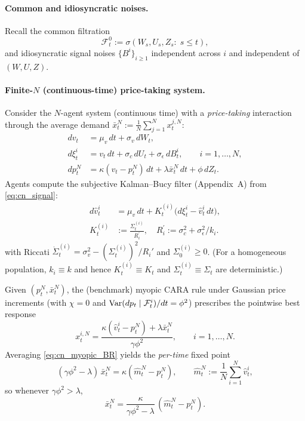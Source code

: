 \paragraph{Common and idiosyncratic noises.}
Recall the common filtration
\[
\mathcal F^0_t := \sigma(W_s,U_s,Z_s:\; s\le t),
\]
and idiosyncratic signal noises $\{B^i\}_{i\ge 1}$ independent across $i$ and independent of $(W,U,Z)$.

\paragraph{Finite-$N$ (continuous-time) price-taking system.}
Consider the $N$-agent system (continuous time) with a \emph{price-taking} interaction through the
average demand $\bar x^N_t := \frac1N\sum_{j=1}^N x^{j,N}_t$:
\begin{align}
dv_t &= \mu_v\,dt + \sigma_v\,dW_t, \label{eq:cn_v}\\
d\xi^i_t &= v_t\,dt + \sigma_c\,dU_t + \sigma_\epsilon\,dB^i_t,\qquad i=1,\dots,N, \label{eq:cn_signal}\\
dp^N_t &= \kappa(v_t-p^N_t)\,dt + \lambda \bar x^N_t\,dt + \phi\,dZ_t. \label{eq:cn_priceN}
\end{align}
Agents compute the subjective Kalman--Bucy filter (Appendix~A) from \eqref{eq:cn_signal}:
\begin{equation}\label{eq:cn_filter}
\begin{split}
d\hat v^{i}_t &= \mu_v\,dt + K_t^{(i)}\bigl(d\xi^i_t - \hat v^{i}_t\,dt\bigr),\\
K_t^{(i)} &:= \frac{\Sigma_t^{(i)}}{R^{\prime}_i},\quad R^{\prime}_i:=\sigma_c^2+\sigma_\epsilon^2/k_i.
\end{split}
\end{equation}
with Riccati $\dot\Sigma_t^{(i)}=\sigma_v^2-(\Sigma_t^{(i)})^2/R_i'$ and $\Sigma_0^{(i)}\ge 0$.
(For a homogeneous population, $k_i\equiv k$ and hence $K_t^{(i)}\equiv K_t$ and $\Sigma_t^{(i)}\equiv \Sigma_t$
are deterministic.)

Given $(p^N_t,\bar x^N_t)$, the (benchmark) myopic CARA rule under Gaussian price increments (with $\chi=0$ and $\text{Var}(dp_t\mid\mathcal F_t^i)/dt=\phi^2$) prescribes the pointwise best response
\begin{equation}\label{eq:cn_myopic_BR}
x^{i,N}_t
= \frac{\kappa(\hat v^i_t-p^N_t)+\lambda \bar x^N_t}{\gamma\phi^2},
\qquad i=1,\dots,N.
\end{equation}
Averaging \eqref{eq:cn_myopic_BR} yields the \emph{per-time} fixed point
\begin{equation}\label{eq:cn_fpN}
(\gamma\phi^2-\lambda)\,\bar x^N_t = \kappa(\hat m^N_t-p^N_t),
\qquad
\hat m^N_t:=\frac1N\sum_{i=1}^N \hat v^i_t,
\end{equation}
so whenever $\gamma\phi^2>\lambda$,
\begin{equation}\label{eq:cn_barxN_closed}
\bar x^N_t = \frac{\kappa}{\gamma\phi^2-\lambda}\,(\hat m^N_t-p^N_t).
\end{equation}

